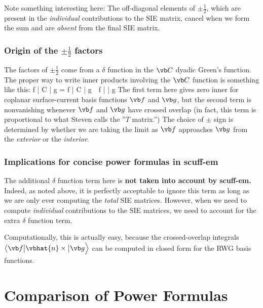 \documentclass{article}
\newcommand{\vmv}[3]{ \big\langle #1 \big| #2 \big| #3 \Big\rangle}
\newcommand{\VMV}[3]{ \Big\langle #1 \Big| #2 \Big| #3 \Big\rangle}
\begin{document}
Note something interesting here: The off-diagonal elements of 
$\pm \frac{1}{2}$, which are present in the \textit{individual}
contributions to the SIE matrix, cancel when we form the sum 
and are \textit{absent} from the final SIE matrix.

\subsubsection*{Origin of the $\pm\frac{1}{2}$ factors}

The factors of $\pm \frac{1}{2}$ come from a $\delta$ function
in the $\vb C$ dyadic Green's function. The proper way to 
write inner products involving the $\vb C$ function is something
like this:
{
   \VMV{\vb f}{\vb C}{\vb g} 
   = 
     \VMV{\vb f}{\vb C}{\vb g} 
     \,\pm\, 
     \cdot \VMV{\vb f}{\times}{\vb g} 
}
The first term here gives zero inner for coplanar surface-current 
basis functions $\vb f$ and $\vb g$, but the second term 
is nonvanishing whenever $\vb f$ and $\vb g$ have crossed
overlap (in fact, this term is proportional to what Steven
calls the ''$T$ matrix.'') The choice of $\pm$ sign is 
determined by whether we are taking the limit as $\vb f$ approaches
$\vb g$ from the \textit{exterior} or the \textit{interior}. 

\subsubsection*{Implications for concise power formulas in {\sc scuff-em}}

The additional $\delta$ function term here is
\textbf{not taken into account by {\sc scuff-em.}}
Indeed, as noted above, it is perfectly acceptable 
to ignore this term as long as we are only ever computing
the \textit{total} SIE matrices. 
However, when we need to compute \textit{individual} 
contributions to the SIE matrices, we need to account for
the extra $\delta$ function term. 

Computationally, this is actually easy, because the crossed-overlap
integrals $\vmv{\vb f}{\vbhat{n}\times}{\vb g}$ can be computed in 
closed form for the RWG basis functions.

\newpage
\section{Comparison of Power Formulas}
\end{document}
